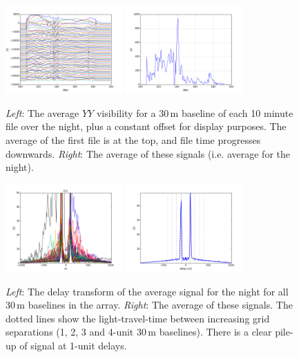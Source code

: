 \documentclass[10pt,a4paper,notitlepage]{article}
\begin{document}
\begin{figure}
\centering
\includegraphics[width=0.4\textwidth]{6250_yy_xtalk_per_file.png}
\includegraphics[width=0.4\textwidth]{6250_yy_xtalk_that_night.png}
\caption{\textit{Left}: The average $YY$ visibility for a 30\,m baseline of each 10 minute file over the night, plus a constant offset for display purposes. The average of the first file is at the top, and file time progresses downwards. \textit{Right}: The average of these signals (i.e. average for the night).}
\label{fig:xtalk-per-file}
\end{figure}

\begin{figure}
\centering
\includegraphics[width=0.4\textwidth]{6250_yy_xtalk_that_night_BLtype1_d.png}
\includegraphics[width=0.4\textwidth]{6250_yy_xtalk_that_night_BLtype1_median_d.png}
\caption{\textit{Left}: The delay transform of the average signal for the night for all 30\,m baselines in the array. \textit{Right}: The average of these signals. The dotted lines show the light-travel-time between increasing grid separations (1, 2, 3 and 4-unit 30\,m baselines). There is a clear pile-up of signal at 1-unit delays.}
\label{fig:xtalk-for-BL1}
\end{figure}
\end{document}
